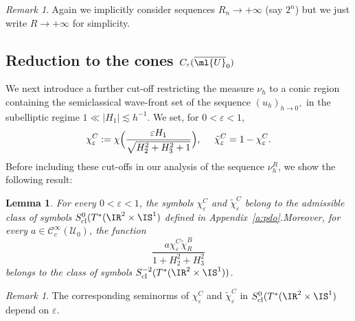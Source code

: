 \documentclass[JEP,XML,SOM,Unicode, NoEqCountersInSection,published]{cedram}
\theoremstyle{plain}
\newtheorem{lemm}[theo]{Lemma}
\theoremstyle{definition}
\theoremstyle{remark}
\newtheorem{rema}[theo]{Remark}
\begin{document}
\begin{rema}
Again we implicitly consider sequences $R_n\to +\infty$ (say $2^n$) but we just write $R\to +\infty$ for simplicity.
\end{rema}

\subsection{Reduction to the cones $C_\varepsilon(\overline{\ml{U}}_0)$}
\label{ss:points-infinity}

We next introduce a further cut-off restricting the measure $\nu_h$ to a conic region containing the semiclassical wave-front set of the sequence $(u_h)_{h\to 0^+}$ in the subelliptic regime $1 \ll \vert H_1 \vert\lesssim h^{-1}$. We set, for $0<\varepsilon< 1$,
\begin{equation}%
\chi_\varepsilon^C:=\chi\Bigl(\frac{\varepsilon H_1}{\sqrt{H_2^2+H_3^2+1}}\Bigr),\ \quad\tilde{\chi}_\varepsilon^C=1-\chi_\varepsilon^C.
\end{equation}
Before including these cut-offs in our analysis of the sequence $\nu_h^R$, we show the following result:

\begin{lemm}\label{l:symbol} For every $0<\varepsilon<1$, the symbols $\chi_\varepsilon^C$ and $\tilde{\chi}_\varepsilon^C$ belong to the admissible class of symbols $S^0_{\operatorname{cl}}(T^*(\IR^2\times\IS^1)$ defined in Appendix~\ref{a:pdo}.Moreover, for every $a\in\mathcal{C}^\infty_c(\mathcal{U}_0)$, the function
\[
\frac{a\chi_\varepsilon^C\tilde{\chi}_R^B}{1+H_2^2+H_3^2}
\]
belongs to the class of symbols $S^{-2}_{\operatorname{cl}}(T^*(\IR^2\times\IS^1))$.
\end{lemm}
\begin{rema}
The corresponding seminorms of $\chi_\varepsilon^C$ and $\tilde{\chi}_\varepsilon^C$ in $S^0_{\operatorname{cl}}(T^*(\IR^2\times\IS^1)$ depend on $\varepsilon$.
\end{rema}
\end{document}
